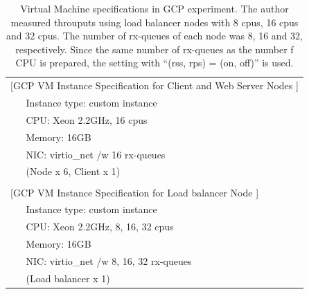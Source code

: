 {
\setlength{\tabcolsep}{3em}
\renewcommand{\arraystretch}{1.1}

\begin{table}[h]
  \centering
  \begin{tabular}{ll}
    \hline 
    \multicolumn{2}{l}{[GCP VM Instance Specification for Client and Web Server Nodes ]}   \\
    & Instance type: custom instance \\
    & CPU: Xeon 2.2GHz, 16 cpus \hspace{2cm} \\
    & Memory: 16GB \\
    & NIC: virtio\_net /w 16 rx-queues \\
    & (Node x 6, Client x 1) \\
    & \\
    \multicolumn{2}{l}{[GCP VM Instance Specification for Load balancer Node ]}   \\
    & Instance type: custom instance \\
    & CPU: Xeon 2.2GHz, 8, 16, 32 cpus \hspace{2cm} \\
    & Memory: 16GB \\
    & NIC: virtio\_net /w 8, 16, 32 rx-queues \\
    & (Load balancer x 1) \\
    \hline
  \end{tabular}
  \par\bigskip
  \centering
  \begin{minipage}{0.8\columnwidth}
    \caption[Virtual Machine specifications in GCP experiment]{
Virtual Machine specifications in GCP experiment.
The author measured throuputs using load balancer nodes with 8 cpus, 16 cpus and 32 cpus.
The number of rx-queues of each node was 8, 16 and 32, respectively.
Since the same number of rx-queues as the number f CPU is prepared, the setting with \enquote{(rss, rps) = (on, off)} is used.
    }
    \label{fig:gcp_machine_spec}
  \end{minipage}
\end{table}
}

